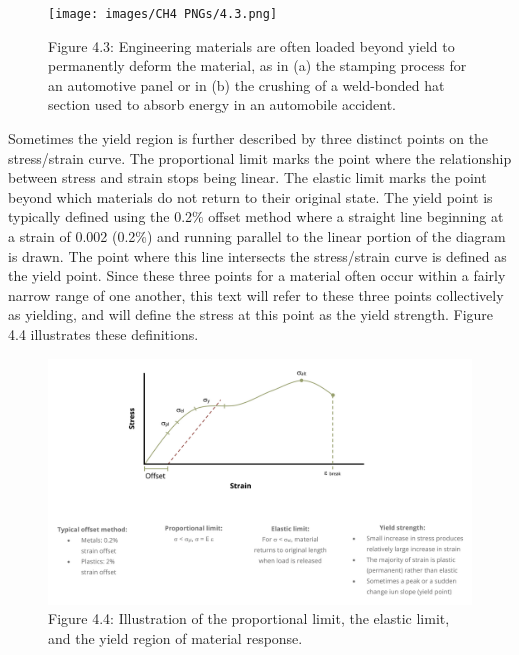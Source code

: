 \documentclass[
  letterpaper,
  DIV=11,
  numbers=noendperiod]{scrreprt}
\theoremstyle{definition}
\theoremstyle{remark}
\begin{document}
\begin{figure}[H]

{\centering \texttt{[image: images/CH4 PNGs/4.3.png]}

}

\caption{Figure 4.3: Engineering materials are often loaded beyond yield
to permanently deform the material, as in (a) the stamping process for
an automotive panel or in (b) the crushing of a weld-bonded hat section
used to absorb energy in an automobile accident.}

\end{figure}%

Sometimes the yield region is further described by three distinct points
on the stress/strain curve. The proportional limit marks the point where
the relationship between stress and strain stops being linear. The
elastic limit marks the point beyond which materials do not return to
their original state. The yield point is typically defined using the
0.2\% offset method where a straight line beginning at a strain of 0.002
(0.2\%) and running parallel to the linear portion of the diagram is
drawn. The point where this line intersects the stress/strain curve is
defined as the yield point. Since these three points for a material
often occur within a fairly narrow range of one another, this text will
refer to these three points collectively as yielding, and will define
the stress at this point as the yield strength. Figure 4.4 illustrates
these definitions.

\begin{figure}[H]

{\centering \includegraphics{images/CH4 PNGs/4.4.png}

}

\caption{Figure 4.4: Illustration of the proportional limit, the elastic
limit, and the yield region of material response.}

\end{figure}%
\end{document}
